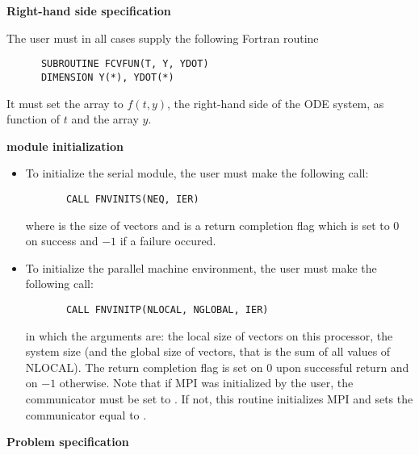 \begin{Steps}
  
\item {\bf Right-hand side specification}
  
  The user must in all cases supply the following Fortran routine
\begin{verbatim}
      SUBROUTINE FCVFUN(T, Y, YDOT)
      DIMENSION Y(*), YDOT(*)
\end{verbatim}
  It must set the  array to $f(t,y)$, the right-hand side of the ODE
  system, as function of  $t$ and the array  $y$.  
  
\item  {\bf {\nvector} module initialization}

  \begin{itemize}
  \item {\s}
    To initialize the serial {\nvector} module, the user must make the following call:
\begin{verbatim}
       CALL FNVINITS(NEQ, IER)
\end{verbatim}
    where  is the size of vectors and
     is a  return completion flag which is set to $0$ on success and $-1$ 
    if a failure occured.
    
  \item {\p}
    To initialize the parallel machine environment, the user must make the following call:
\begin{verbatim}
       CALL FNVINITP(NLOCAL, NGLOBAL, IER)
\end{verbatim}
    in which the arguments are:  the local size of vectors on this processor,
     the system size (and the global size of vectors, that is the sum 
    of all values of NLOCAL). The return completion flag  is set on $0$ upon
    successful return and on $-1$ otherwise.
    Note that if MPI was initialized by the user, the communicator must be
    set to .  If not, this routine initializes MPI and sets
    the communicator equal to .
  \end{itemize}
  
\item {\bf Problem specification}


\end{Steps}
